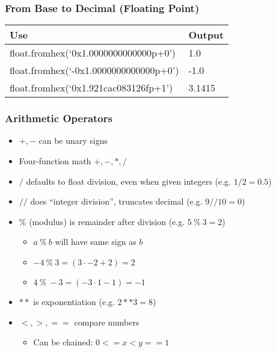 \documentclass{beamer}
\begin{document}
\begin{frame}
  \frametitle{From Base to Decimal (Floating Point)}

  \begin{table}
    \begin{tabular}{l | l}
    Use          & Output   \\
    \hline
    float.fromhex(`0x1.0000000000000p+0')    &  1.0    \\
    float.fromhex(`-0x1.0000000000000p+0')   & -1.0    \\
    float.fromhex(`0x1.921cac083126fp+1')    &  3.1415 \\
    \end{tabular}
  \end{table}
\end{frame}

\begin{frame}
  \frametitle{Arithmetic Operators}

  \begin{itemize}
  \item $+, -$ can be unary signs
  \item Four-function math $+, -, *, /$
  \item $/$ defaults to float division, even when given integers (e.g. $1/2=0.5$)
  \item $//$ does ``integer division'', truncates decimal (e.g. $9//10=0$)
  \item $\%$ (modulus) is remainder after division (e.g. $5 ~\%~ 3 = 2$)
    \begin{itemize}
      \item $a ~\%~ b$ will have same sign as $b$
      \item $-4 ~\%~ 3 = (3\cdot-2 + 2) = 2$
      \item $4 ~\%~ -3 = (-3\cdot1 - 1) = -1$
     \end{itemize}
  \item $**$ is exponentiation (e.g. $2**3=8$)
  \item $<, >, ==$ compare numbers
    \begin{itemize}
      \item Can be chained: $0 <= x < y == 1$
    \end{itemize}
  \end{itemize}
\end{frame}
\end{document}
